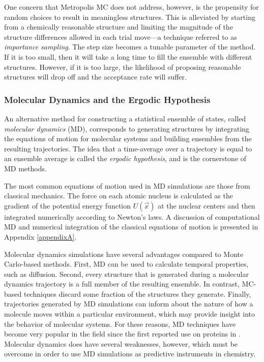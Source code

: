 One concern that Metropolis MC does not address, however, is the propensity for
random choices to result in meaningless structures. This is alleviated by
starting from a chemically reasonable structure and limiting the magnitude of
the structure differences allowed in each trial move---a technique referred to
as \emph{importance sampling}. The step size becomes a tunable parameter of the
method. If it is too small, then it will take a long time to fill the ensemble
with different structures. However, if it is too large, the likelihood of
proposing reasonable structures will drop off and the acceptance rate will
suffer.

\subsubsection{Molecular Dynamics and the Ergodic Hypothesis}

An alternative method for constructing a statistical ensemble of states, called
\emph{molecular dynamics} (MD), corresponds to generating structures by
integrating the equations of motion for molecular systems and building ensembles
from the resulting trajectories. The idea that a time-average over a trajectory
is equal to an ensemble average is called the \emph{ergodic hypothesis}, and is
the cornerstone of MD methods.

The most common equations of motion used in MD simulations are those from
classical mechanics. The force on each atomic nucleus is calculated as the
gradient of the potential energy function $U(\vec{x})$ at the nuclear centers
and then integrated numerically according to Newton's laws. A discussion of
computational MD and numerical integration of the classical equations of motion
is presented in Appendix \ref{appendixA}.

Molecular dynamics simulations have several advantages compared to Monte
Carlo-based methods. First, MD can be used to calculate temporal properties,
such as diffusion. Second, every structure that is generated during a molecular
dynamics trajectory is a full member of the resulting ensemble. In contrast,
MC-based techniques discard some fraction of the structures they generate.
Finally, trajectories generated by MD simulations can inform about the nature of
how a molecule moves within a particular environment, which may provide insight
into the behavior of molecular systems. For these reasons, MD techniques have
become very popular in the field since the first reported use on proteins in
\citeyear{McCammon_Nature_1977_v267_p585}.
\cite{McCammon_Nature_1977_v267_p585} Molecular dynamics does have several
weaknesses, however, which must be overcome in order to use MD simulations as
predictive instruments in chemistry.

